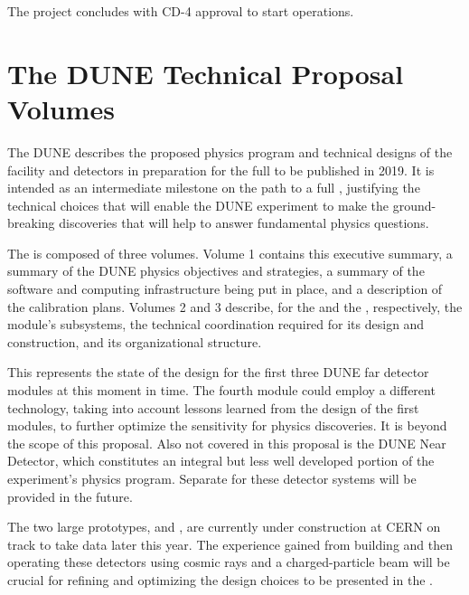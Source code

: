 The project concludes with CD-4 approval to start operations.


\section{The DUNE Technical Proposal Volumes}


The DUNE  describes the proposed physics program and 
technical designs of the facility and detectors in preparation for the full  
to be published in 2019.  
It is intended as an intermediate
milestone on the path to a full , justifying the technical choices that will enable the DUNE experiment to make the ground-breaking discoveries that will help to  answer %
fundamental physics questions.

The   is composed of three volumes. 
Volume 1 contains this executive summary, a summary of the DUNE physics objectives and strategies, a summary of the software and computing infrastructure  being put in place, and a description of the calibration plans. 
Volumes 2  and 3 describe, for the  and the , respectively, the module's subsystems, the technical coordination required for its design and construction, and its organizational structure.


This   represents the state of the design for the first three DUNE far detector modules at this moment
in time. The fourth module could employ a different \lartpc technology, taking into account lessons learned from the design of the first modules,  to further optimize the sensitivity for physics discoveries. It is beyond the scope of this proposal. Also not covered in this proposal is the DUNE Near Detector, which constitutes an integral but less well developed portion of the experiment's  physics program. Separate   for these detector systems will be
provided in the future.

The two large prototypes,  and , are currently under construction at CERN on track to take data later this year. 
The experience gained from building and then operating these detectors using cosmic rays and a charged-particle beam will be crucial for refining and optimizing the design choices to be presented in the . %

